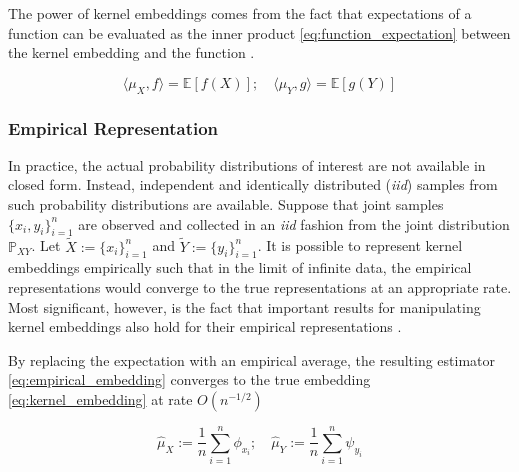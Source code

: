 \documentclass[twoside]{article} \usepackage{aistats2017}
\theoremstyle{definition}
\theoremstyle{theorem}
\newcommand{\rv}[1]{{#1}}
\newcommand{\ds}[1]{\tilde{#1}}
\newcommand{\expect}[1]{{\mathbb{E}[#1]}}
\newcommand{\inner}[2]{{\langle #1, #2 \rangle}}
\newcommand{\muX}{\mu_{\rv{X}}}
\newcommand{\muY}{\mu_{\rv{Y}}}
\newcommand{\hatmuX}{\hat{\mu}_{\rv{X}}}
\newcommand{\hatmuY}{\hat{\mu}_{\rv{Y}}}
\begin{document}
		The power of kernel embeddings comes from the fact that expectations of a function can be evaluated as the inner product \eqref{eq:function_expectation} between the kernel embedding and the function \citep{muandet2016kernel}.
		
		\begin{equation}
			\inner{\muX}{f} = \expect{f(\rv{X})} ;\quad \inner{\muY}{g} = \expect{g(\rv{Y})}
		\label{eq:function_expectation}
		\end{equation}

		
		\subsubsection{Empirical Representation}
		\label{sec:background:kernel_embeddings:empirical_representation}
			
			In practice, the actual probability distributions of interest are not available in closed form. Instead, independent and identically distributed (\textit{iid}) samples from such probability distributions are available. Suppose that joint samples $\{x_{i}, y_{i}\}_{i = 1}^{n}$ are observed and collected in an \textit{iid} fashion from the joint distribution $\mathbb{P}_{\rv{X} \rv{Y}}$. Let $\ds{X} := \{x_{i}\}_{i = 1}^{n}$ and $\ds{Y} := \{y_{i}\}_{i = 1}^{n}$. It is possible to represent kernel embeddings empirically such that in the limit of infinite data, the empirical representations would converge to the true representations at an appropriate rate. Most significant, however, is the fact that important results for manipulating kernel embeddings also hold for their empirical representations \citep{muandet2016kernel}.
			
			By replacing the expectation with an empirical average, the resulting estimator \eqref{eq:empirical_embedding} converges to the true embedding \eqref{eq:kernel_embedding} at rate $O(n^{-1/2})$ \citep{smola2007hilbert}

			\begin{equation}
				\hatmuX := \frac{1}{n} \sum_{i = 1}^{n} \phi_{x_{i}} ;\quad \hatmuY := \frac{1}{n} \sum_{i = 1}^{n} \psi_{y_{i}}
			\label{eq:empirical_embedding}
			\end{equation}

%
\end{document}
